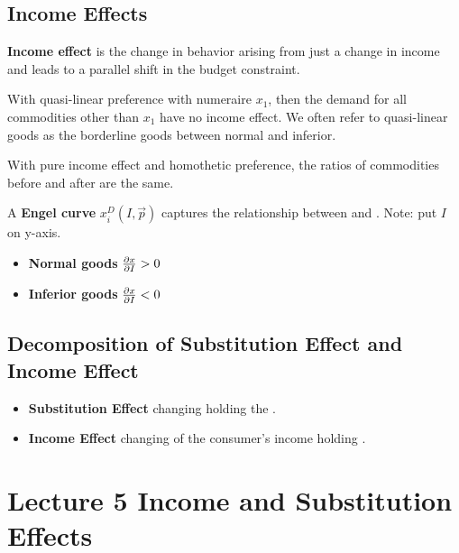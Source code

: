 \documentclass[]{article}
\begin{document}
        \subsection{Income Effects}
            \begin{definition}
                \textbf{Income effect} is the change in behavior arising from just a change in income and leads to a parallel shift in the budget constraint.
            \end{definition}
            
            \begin{remark}
                With quasi-linear preference with numeraire $x_1$, then the demand for all  commodities other than $x_1$ have no income effect. We often refer to quasi-linear goods as the borderline goods between normal and inferior.
            \end{remark}
            
            \begin{remark}
                With pure income effect and homothetic preference, the ratios of commodities before and after are the same.
            \end{remark}
            
            \begin{definition}
                A \textbf{Engel curve} $x_i^D(I, \vec{p})$ captures the relationship between  and . Note: put $I$ on y-axis.
            \end{definition}
            
            \begin{itemize}
                \item \textbf{Normal goods} $\frac{\partial{x}}{\partial{I}} > 0$
                \item \textbf{Inferior goods} $\frac{\partial{x}}{\partial{I}} < 0$
            \end{itemize}
            
        \subsection{Decomposition of Substitution Effect and Income Effect}
            \begin{itemize}
                \item \textbf{Substitution Effect} changing  holding the .
                \item \textbf{Income Effect} changing  of the consumer's income holding 
                .
            \end{itemize}
            
    \section{Lecture 5 Income and Substitution Effects}
\end{document}
